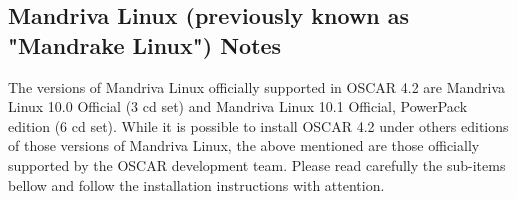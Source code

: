 
\subsection{Mandriva Linux (previously known as "Mandrake Linux") Notes}
\label{subsec:mdk10notes}

The versions of Mandriva Linux officially supported in OSCAR 4.2 are
Mandriva Linux 10.0 Official (3 cd set) and Mandriva Linux 10.1 Official, 
PowerPack edition (6 cd set). While it is possible to install OSCAR 4.2 under 
others editions of those versions of Mandriva Linux, the above mentioned are
those officially supported by the OSCAR development team. Please read 
carefully the sub-items bellow and follow the installation instructions
with attention. 


